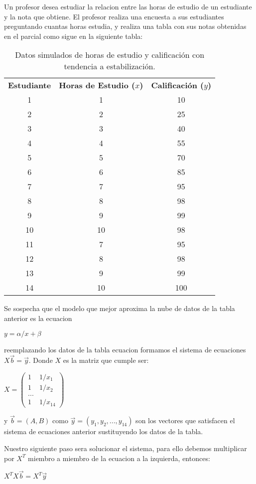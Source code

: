 \documentclass{article}
\begin{document}
Un profesor desea estudiar la relacion entre las horas de estudio de un estudiante y la nota que obtiene. El profesor
realiza una encuesta a sus estudiantes preguntando cuantas horas estudia, y realiza una tabla con sus notas obtenidas 
en el parcial como sigue en la siguiente tabla:
\begin{table}[h!]
    \centering
    \begin{tabular}{|c|c|c|}
    \hline
    \textbf{Estudiante} & \textbf{Horas de Estudio (\(x\))} & \textbf{Calificación (\(y\))} \\
    1  & 1  & 10   \\ \hline 
    2  & 2  & 25   \\ \hline
    3  & 3  & 40   \\ \hline
    4  & 4  & 55   \\ \hline
    5  & 5  & 70   \\ \hline
    6  & 6  & 85   \\ \hline
    7  & 7  & 95   \\ \hline
    8  & 8  & 98   \\ \hline
    9  & 9  & 99   \\ \hline
    10 & 10 & 98  \\ \hline
    11  & 7  & 95   \\ \hline
    12  & 8  & 98   \\ \hline
    13  & 9  & 99   \\ \hline
    14 & 10 & 100  \\ \hline
    \end{tabular}
    \caption{Datos simulados de horas de estudio y calificación con tendencia a estabilización.}
    \label{tabla:horas_estudio_aplanada}
\end{table}

Se sospecha que el modelo que mejor aproxima la nube de datos de la tabla anterior es la ecuacion

\begin{center}
    $y = \alpha /x + \beta$
\end{center}

reemplazando los datos de la tabla ecuacion formamos el sistema de ecuaciones $X \vec{b} = \vec{y}$. Donde $X$ es la matriz que cumple ser:

$ X = \begin{pmatrix} 1 & 1/x_1 \\ 1 & 1/x_2 \\ ... \\ 1 & 1/x_14 \end{pmatrix}$

y $\vec{b} = (A,B)$ como $\vec{y} = (y_1, y_2,...,y_14)$ son los vectores que satisfacen el sistema de ecuaciones anterior sustituyendo los datos
de la tabla. 

Nuestro siguiente paso sera solucionar el sistema, para ello debemos multiplicar por $X^T$ miembro a miembro de la ecuacion a la izquierda,
entonces: 

\begin{center}
    $X^T X \vec{b} = X^T \vec{y}$    
\end{center}
\end{document}
